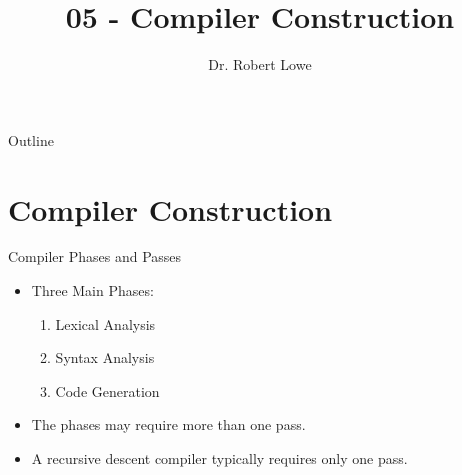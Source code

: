 \documentclass[]{beamer}
\title{05 - Compiler Construction}
\author{Dr. Robert Lowe\\}
\institute[Maryville College] %
{
  Division of Mathematics and Computer Science\\
  Maryville College
}
\date[]{}
\begin{document}
\begin{frame}
  \titlepage
\end{frame}

\begin{frame}{Outline}
  \tableofcontents
\end{frame}





\section{Compiler Construction}

\begin{frame}{Compiler Phases and Passes}
    \begin{itemize}[<+->]
        \item Three Main Phases:
        \begin{enumerate}
            \item Lexical Analysis
            \item Syntax Analysis
            \item Code Generation
        \end{enumerate}
        \item The phases may require more than one pass.
        \item A recursive descent compiler typically requires only one
            pass.
    \end{itemize} 
\end{frame}
\end{document}
